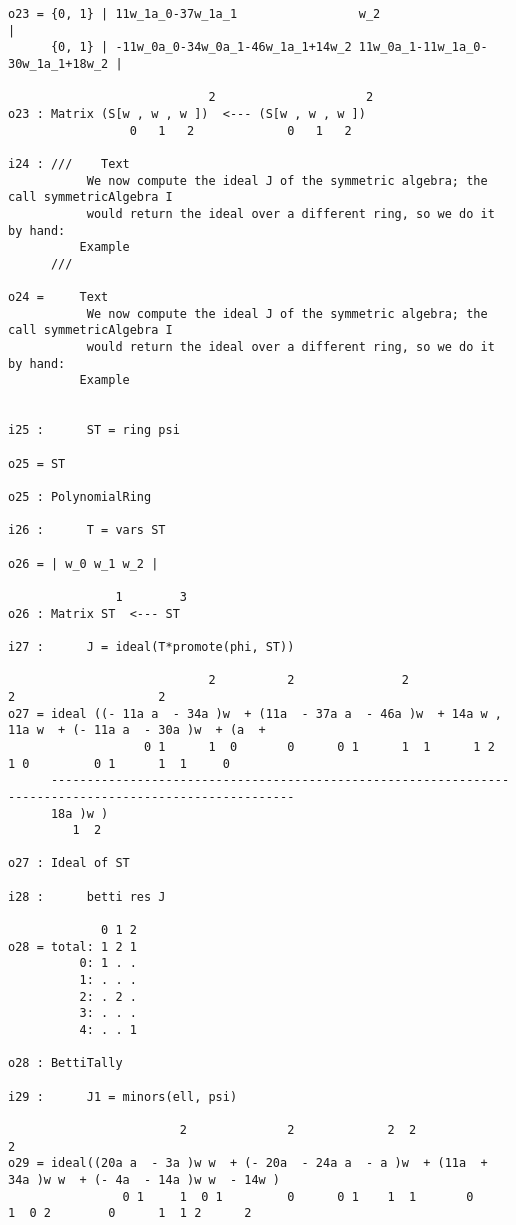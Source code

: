 \documentclass[twoside,12pt, leqno]{amsart}
\begin{document}
\begin{verbatim}
o23 = {0, 1} | 11w_1a_0-37w_1a_1                 w_2                              |
      {0, 1} | -11w_0a_0-34w_0a_1-46w_1a_1+14w_2 11w_0a_1-11w_1a_0-30w_1a_1+18w_2 |

                            2                     2
o23 : Matrix (S[w , w , w ])  <--- (S[w , w , w ])
                 0   1   2             0   1   2

i24 : ///    Text
           We now compute the ideal J of the symmetric algebra; the call symmetricAlgebra I
           would return the ideal over a different ring, so we do it by hand:
          Example
      ///    

o24 =     Text
           We now compute the ideal J of the symmetric algebra; the call symmetricAlgebra I
           would return the ideal over a different ring, so we do it by hand:
          Example


i25 :      ST = ring psi

o25 = ST

o25 : PolynomialRing

i26 :      T = vars ST

o26 = | w_0 w_1 w_2 |

               1        3
o26 : Matrix ST  <--- ST

i27 :      J = ideal(T*promote(phi, ST))

                            2          2               2                 2                    2
o27 = ideal ((- 11a a  - 34a )w  + (11a  - 37a a  - 46a )w  + 14a w , 11a w  + (- 11a a  - 30a )w  + (a  +
                   0 1      1  0       0      0 1      1  1      1 2     1 0         0 1      1  1     0  
      --------------------------------------------------------------------------------------------------------
      18a )w )
         1  2

o27 : Ideal of ST

i28 :      betti res J

             0 1 2
o28 = total: 1 2 1
          0: 1 . .
          1: . . .
          2: . 2 .
          3: . . .
          4: . . 1

o28 : BettiTally

i29 :      J1 = minors(ell, psi)

                        2              2             2  2                                               2
o29 = ideal((20a a  - 3a )w w  + (- 20a  - 24a a  - a )w  + (11a  + 34a )w w  + (- 4a  - 14a )w w  - 14w )
                0 1     1  0 1         0      0 1    1  1       0      1  0 2        0      1  1 2      2


\end{verbatim}
\end{document}
